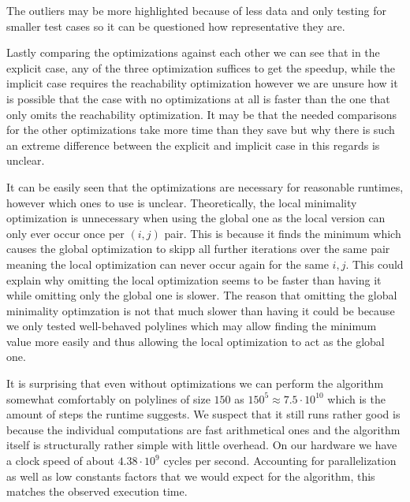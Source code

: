 The outliers may be more highlighted because of less data and only testing for smaller test cases so it can be questioned how representative they are. 

Lastly comparing the optimizations against each other we can see that in the explicit case, any of the three optimization suffices to get the speedup, while the implicit case requires the reachability optimization however we are unsure how it is possible that the case with no optimizations at all is faster than the one that only omits the reachability optimization. It may be that the needed comparisons for the other optimizations take more time than they save but why there is such an extreme difference between the explicit and implicit case in this regards is unclear. 

It can be easily seen that the optimizations are necessary for reasonable runtimes, however which ones to use is unclear. Theoretically, the local minimality optimization is unnecessary when using the global one as the local version can only ever occur once per \((i, j)\) pair. This is because it finds the minimum which causes the global optimization to skipp all further iterations over the same pair meaning the local optimization can never occur again for the same \(i, j\). This could explain why omitting the local optimization seems to be faster than having it while omitting only the global one is slower. The reason that omitting the global minimality optimzation is not that much slower than having it could be because we only tested well-behaved polylines which may allow finding the minimum value more easily and thus allowing the local optimization to act as the global one. 

It is surprising that even without optimizations we can perform the algorithm somewhat comfortably on polylines of size \(150\) as \(150^5 \approx 7.5 \cdot 10^{10}\) which is the amount of steps the runtime suggests. We suspect that it still runs rather good is because the individual computations are fast arithmetical ones and the algorithm itself is structurally rather simple with little overhead. On our hardware we have a clock speed of about \(4.38 \cdot 10^9\) cycles per second. Accounting for parallelization as well as low constants factors that we would expect for the algorithm, this matches the observed execution time.

